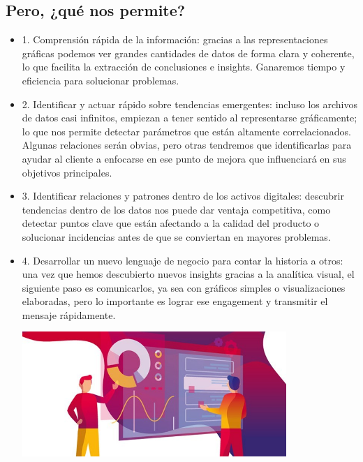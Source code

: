 \documentclass[preprint,12pt]{elsarticle}
\begin{document}
\subsection{Pero, ¿qué nos permite?}
	
\begin{itemize}
\item	1.	Comprensión rápida de la información: gracias a las representaciones gráficas podemos ver grandes cantidades de datos de forma clara y coherente, lo que facilita la extracción de conclusiones e insights. Ganaremos tiempo y eficiencia para solucionar problemas.
\item 2.	Identificar y actuar rápido sobre tendencias emergentes: incluso los archivos de datos casi infinitos, empiezan a tener sentido al representarse gráficamente; lo que nos permite detectar parámetros que están altamente correlacionados. Algunas relaciones serán obvias, pero otras tendremos que identificarlas para ayudar al cliente a enfocarse en ese punto de mejora que influenciará en sus objetivos principales.
\item 3.	Identificar relaciones y patrones dentro de los activos digitales: descubrir tendencias dentro de los datos nos puede dar ventaja competitiva, como detectar puntos clave que están afectando a la calidad del producto o solucionar incidencias antes de que se conviertan en mayores problemas.
\item	 4.	Desarrollar un nuevo lenguaje de negocio para contar la historia a otros: una vez que hemos descubierto nuevos insights gracias a la analítica visual, el siguiente paso es comunicarlos, ya sea con gráficos simples o visualizaciones elaboradas, pero lo importante es lograr ese engagement y transmitir el mensaje rápidamente. \\

	\begin{center}
	\includegraphics[width=10cm]{./Imagenes/imagen4} 
	\end{center}
\end{itemize} 
\end{document}
